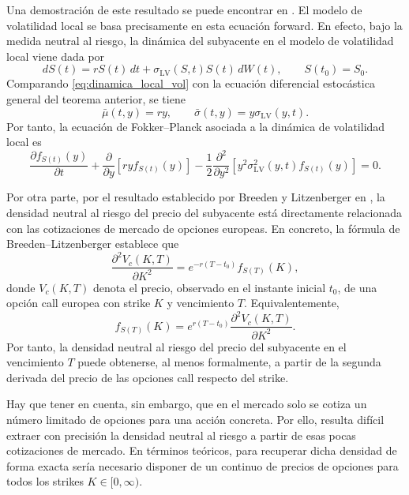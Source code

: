 Una demostración de este resultado se puede encontrar en \cite[Cap.~5, Secs.~5.1 y 5.7, pp.~283 y 368--369]{Karatzas1991}. El modelo de volatilidad local se basa precisamente en esta ecuación forward. En efecto, bajo la medida neutral al riesgo, la dinámica del subyacente en el modelo de volatilidad local viene dada por
\begin{equation}
dS(t)=rS(t)\,dt+\sigma_{\mathrm{LV}}(S,t)S(t)\,dW(t),
\qquad S(t_0)=S_0.
\label{eq:dinamica_local_vol}
\end{equation}
Comparando \ref{eq:dinamica_local_vol} con la ecuación diferencial estocástica general del teorema anterior, se tiene
\[
\bar{\mu}(t,y)=ry,
\qquad
\bar{\sigma}(t,y)=y\sigma_{\mathrm{LV}}(y,t).
\]
Por tanto, la ecuación de Fokker--Planck asociada a la dinámica de volatilidad local es
\begin{equation}
\frac{\partial f_{S(t)}(y)}{\partial t}
+
\frac{\partial}{\partial y}\left[ry f_{S(t)}(y)\right]
-
\frac{1}{2}
\frac{\partial^2}{\partial y^2}
\left[
y^2\sigma_{\mathrm{LV}}^2(y,t) f_{S(t)}(y)
\right]
=0.
\label{eq:fokker_planck_local_vol}
\end{equation}

Por otra parte, por el resultado establecido por Breeden y Litzenberger en \cite{BreedenPrices}, la densidad neutral al riesgo del precio del subyacente está directamente relacionada con las cotizaciones de mercado de opciones europeas. En concreto, la fórmula de Breeden--Litzenberger establece que
\begin{equation}
\label{eq:Breeden--Litzenberger}
\frac{\partial^2 V_c(K,T)}{\partial K^2}
=
e^{-r(T-t_0)} f_{S(T)}(K),
\end{equation}
donde $V_c(K,T)$ denota el precio, observado en el instante inicial $t_0$, de una opción call europea con strike $K$ y vencimiento $T$. Equivalentemente,
\[
f_{S(T)}(K)
=
e^{r(T-t_0)}
\frac{\partial^2 V_c(K,T)}{\partial K^2}.
\]
Por tanto, la densidad neutral al riesgo del precio del subyacente en el vencimiento $T$ puede obtenerse, al menos formalmente, a partir de la segunda derivada del precio de las opciones call respecto del strike.

Hay que tener en cuenta, sin embargo, que en el mercado solo se cotiza un número limitado de opciones para una acción concreta. Por ello, resulta difícil extraer con precisión la densidad neutral al riesgo a partir de esas pocas cotizaciones de mercado. En términos teóricos, para recuperar dicha densidad de forma exacta sería necesario disponer de un continuo de precios de opciones para todos los strikes $K\in[0,\infty)$.\medskip

